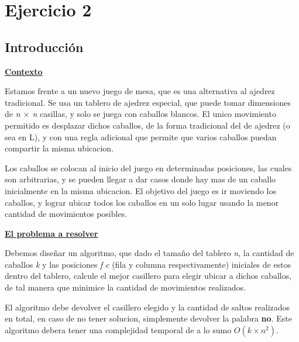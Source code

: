 \documentclass[10pt,a4paper]{article}
\begin{document}
\section{Ejercicio 2}
\subsection{Introducción}
\noindent \underline{\textbf{Contexto}}

Estamos frente a un nuevo juego de mesa, que es una alternativa al ajedrez tradicional. Se usa un tablero de ajedrez especial, que puede tomar dimensiones de \textit{n $\times$ n} casillas, y solo se juega con caballos blancos. El unico movimiento permitido es desplazar dichos caballos, de la forma tradicional del de ajedrez (o sea en L), y con una regla adicional que permite que varios caballos puedan compartir la misma ubicacion.

Los caballos se colocan al inicio del juego en determinadas posiciones, las cuales son arbitrarias, y se pueden llegar a dar casos donde hay mas de un caballo inicialmente en la misma ubicacion. El objetivo del juego es ir moviendo los caballos, y lograr ubicar todos los caballos en un solo lugar usando la menor cantidad de movimientos posibles.

\noindent \underline{\textbf{El problema a resolver}}

Debemos diseñar un algoritmo, que dado el tamaño del tablero \textit{n}, la cantidad de caballos \textit{k} y las posiciones \textit{f} \textit{c} (fila y columna respectivamente) iniciales de estos dentro del tablero, calcule el mejor casillero para elegir ubicar a dichos caballos, de tal manera que minimice la cantidad de movimientos realizados. 

El algoritmo debe devolver el casillero elegido y la cantidad de saltos realizados en total, en caso de no tener solucion, simplemente devolver la palabra \textbf{no}. Este algoritmo debera tener una complejidad temporal de a lo sumo \textit{$O(k \times n^2)$}.
\end{document}
